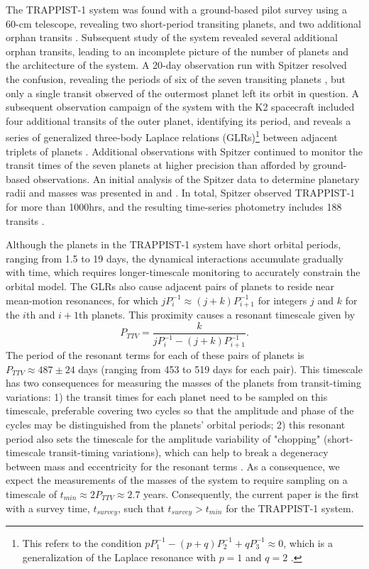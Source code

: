 \documentclass[twocolumn]{aastex63}
\begin{document}
The TRAPPIST-1 system was found with a ground-based pilot survey using a 60-cm telescope, 
revealing two short-period transiting planets, and two additional orphan transits 
\citep{Gillon2016, Burdanov2018}.  Subsequent study of the system revealed several 
additional orphan transits, leading to an incomplete picture of the number of planets 
and the architecture of the system.  A 20-day observation run with Spitzer resolved the 
confusion, revealing the periods of six of the seven transiting planets \citep{Gillon2017},
but only a single transit observed of the outermost planet left its orbit in question.  
A subsequent observation campaign of the system with the K2 spacecraft included four 
additional transits of the outer planet, identifying its period, and reveals a series
of generalized three-body Laplace relations (GLRs)\footnote{This refers to the condition 
$pP_1^{-1}-(p+q)P_2^{-1}+qP_3^{-1} \approx 0$, which is a generalization of the Laplace 
resonance with $p=1$ and $q=2$ \citep{Papaloizou2014}. } between adjacent triplets of 
planets \citep{Luger2017a}.  Additional observations with Spitzer 
continued to monitor the transit times of the seven planets at higher precision than 
afforded by ground-based observations. An initial analysis of the Spitzer data to determine 
planetary radii and masses was presented in \citet{Delrez2018a} and \citet{Grimm2018}. In total, 
Spitzer observed TRAPPIST-1 for more than 1000hrs, and the resulting time-series photometry 
includes 188 transits \citep{Ducrot2020}.

Although the planets in the TRAPPIST-1 system have short orbital periods, ranging from
1.5 to 19 days, the dynamical interactions accumulate gradually with time, which requires 
longer-timescale monitoring to accurately constrain the orbital model.
The GLRs also cause adjacent pairs of planets to reside near mean-motion resonances, 
for which $j P_i^{-1} \approx (j+k) P_{i+1}^{-1}$ for integers $j$ and $k$ for the $i$th and $i+1$th planets.  This proximity causes a resonant timescale 
given by
\begin{equation}
    P_{TTV} = \frac{k}{j P_i^{-1} - (j+k) P_{i+1}^{-1}}.
\end{equation} 
The period of the resonant terms for each of these pairs of planets is $P_{TTV} \approx 487\pm 24$ 
days (ranging from 453 to 519 days for each pair).  This timescale has two consequences for 
measuring the masses of the planets from transit-timing variations:  1)  the transit times 
for each planet need to be sampled on this timescale, preferable covering two cycles so that 
the amplitude and phase of the cycles may be distinguished from the planets' orbital periods; 
2) this resonant period also sets the timescale for the amplitude variability of "chopping" (short-timescale 
transit-timing variations), which can help to break a degeneracy between mass and eccentricity for the resonant terms 
\citep{Lithwick2012,Deck2015}.  As a consequence, we expect the measurements of the masses 
of the system to require sampling on a timescale of $t_{min} \approx 2 P_{TTV} \approx 2.7$ years.  
Consequently, the current paper is the first with a survey time, $t_{survey}$, such that $t_{survey} {>} t_{min}$ for the TRAPPIST-1 system.
\end{document}
